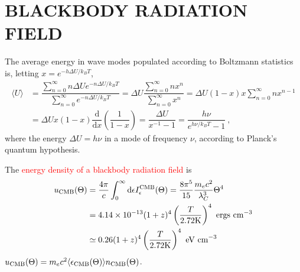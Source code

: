 \documentclass[12pt,a4paper]{article}
\newcommand{\dif}{\mathrm{d}}
\begin{document}
\section{BLACKBODY RADIATION FIELD}
\cite{2009herb.book.....D} The average energy in wave modes populated according to Boltzmann statistics is, letting $x = e^{-h\Delta U/k_B T}$, 
\begin{align}
\langle U \rangle &= \dfrac{\sum\limits_{n=0}^\infty n \Delta U e^{-n\Delta U/k_B T} }{\sum\limits_{n=0}^\infty e^{-n\Delta U/k_B T}} = \Delta U \dfrac{\sum\limits_{n=0}^\infty n x^n}{\sum\limits_{n=0}^\infty x^n} = \Delta U (1-x) x \sum_{n=0}^\infty n x^{n-1} \\
& = \Delta U x(1-x) \dfrac{\dif}{\dif x} \left(\dfrac{1}{1-x} \right) = \dfrac{\Delta U}{x^{-1} -1} = \dfrac{h\nu}{e^{h\nu/k_B T} -1} ~,
\end{align}
where the energy $\Delta U = h\nu$ in a mode of frequency $\nu$, according to Planck's quantum hypothesis.












































































The \textcolor{red}{energy density of a blackbody radiation field} is
\begin{align}
\nonumber u_{\rm CMB} (\Theta) &= \dfrac{4\pi}{c} \int_0^\infty \dif \epsilon I_\epsilon^{\rm CMB}(\Theta) = \dfrac{8\pi^5}{15} \dfrac{m_e c^2}{\lambda_C^3} \Theta^4 \\
\nonumber &= 4.14\times 10^{-13} (1+z)^4 \left(\dfrac{T}{2.72 {\rm K}} \right)^4 ~{\rm ergs ~cm}^{-3} \\
&\simeq 0.26(1+z)^4 \left(\dfrac{T}{2.72 {\rm K}} \right)^4 ~{\rm eV ~cm}^{-3}
\end{align}
$u_{\rm CMB}(\Theta) = m_e c^2 \langle \epsilon_{\rm CMB}(\Theta)\rangle n_{\rm CMB}(\Theta)$.
\end{document}
